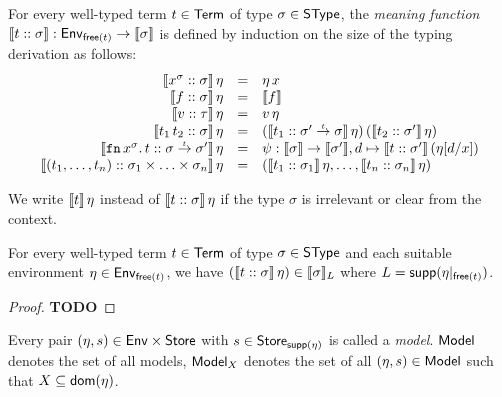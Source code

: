 \documentclass[12pt,a4paper]{report}
\begin{document}
\begin{definition}
  For every well-typed term $t \in \mathsf{Term}$ of type $\sigma \in \mathsf{SType}$, the {\em meaning function}
  $\llbracket{t}\mathrel{::}{\sigma}\rrbracket: \mathsf{Env}_{\mathsf{free}(t)} \to \llbracket\sigma\rrbracket$ is defined by induction on the size
  of the typing derivation as follows:
  \[\begin{array}{rcl}
    \llbracket{x^\sigma}\mathrel{::}{\sigma}\rrbracket\,\eta
      &=& \eta\,x \\
    \llbracket{f}\mathrel{::}{\sigma}\rrbracket\,\eta 
      &=& \llbracket f\rrbracket \\
    \llbracket{v}\mathrel{::}{\tau}\rrbracket\,\eta
      &=& v\,\eta \\
    \llbracket{t_1\,t_2}\mathrel{::}{\sigma}\rrbracket\,\eta
      &=& (\llbracket{t_1}\mathrel{::}{\sigma'\stackrel{_t}{\to}\sigma}\rrbracket\,\eta)\,
          (\llbracket{t_2}\mathrel{::}{\sigma'}\rrbracket\,\eta) \\
    \llbracket{\ensuremath{\mathtt{fn}}\,x^\sigma.\,t}\mathrel{::}{\sigma\stackrel{_t}{\to}\sigma'}\rrbracket\,\eta
      &=& \psi: \llbracket\sigma\rrbracket \to \llbracket\sigma'\rrbracket, d \mapsto \llbracket{t}\mathrel{::}{\sigma'}\rrbracket\,(\eta[d/x]) \\
    \llbracket{(t_1,\ldots,t_n)}\mathrel{::}{\sigma_1\times\ldots\times\sigma_n}\rrbracket\,\eta
      &=& (\llbracket{t_1}\mathrel{::}{\sigma_1}\rrbracket\,\eta,\ldots,\llbracket{t_n}\mathrel{::}{\sigma_n}\rrbracket\,\eta)
  \end{array}\]
\end{definition}

We write $\llbracket t\rrbracket\,\eta$ instead of $\llbracket{t}\mathrel{::}{\sigma}\rrbracket\,\eta$ if the type $\sigma$ is irrelevant or
clear from the context.

\begin{lemma}
  For every well-typed term $t\in\mathsf{Term}$ of type $\sigma\in\mathsf{SType}$ and each suitable environment
  $\eta\in\mathsf{Env}_{\mathsf{free}(t)}$, we have
  $(\llbracket{t}\mathrel{::}{\sigma}\rrbracket\,\eta) \in \llbracket\sigma\rrbracket_L$ where $L = \mathsf{supp}(\eta|_{\mathsf{free}(t)})$.
\end{lemma}

\begin{proof}
  {\bf TODO}
\end{proof}


\begin{definition}[Model]
  Every pair $(\eta,s) \in \mathsf{Env} \times \mathsf{Store}$ with $s\in\mathsf{Store}_{\mathsf{supp}(\eta)}$
  is called a {\em model}. $\mathsf{Model}$ denotes the set of all models, $\mathsf{Model}_X$ denotes the set of all
  $(\eta,s) \in \mathsf{Model}$ such that $X \subseteq \mathsf{dom}(\eta)$.
\end{definition}
\end{document}

